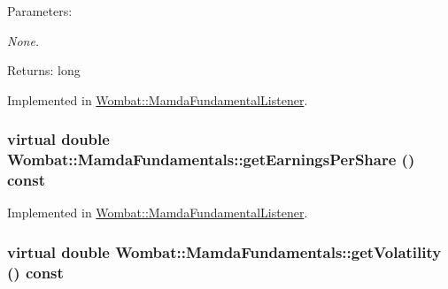 \begin{Desc}
\item[Parameters:]
\begin{description}
\item[{\em None.}]\end{description}
\end{Desc}
\begin{Desc}
\item[Returns:]long\end{Desc}


Implemented in \hyperlink{classWombat_1_1MamdaFundamentalListener_271ea50e95b80126e461612c0ab7ed09}{Wombat::Mamda\-Fundamental\-Listener}.\hypertarget{classWombat_1_1MamdaFundamentals_7e942012bd9711d3bde88b1da09be638}{
\subsubsection[getEarningsPerShare]{\setlength{\rightskip}{0pt plus 5cm}virtual double Wombat::Mamda\-Fundamentals::get\-Earnings\-Per\-Share () const}}
\label{classWombat_1_1MamdaFundamentals_7e942012bd9711d3bde88b1da09be638}




Implemented in \hyperlink{classWombat_1_1MamdaFundamentalListener_e4219dceb76af963348acab9b9a27246}{Wombat::Mamda\-Fundamental\-Listener}.\hypertarget{classWombat_1_1MamdaFundamentals_e5719741fcc970ea66688ed60f6541ad}{
\subsubsection[getVolatility]{\setlength{\rightskip}{0pt plus 5cm}virtual double Wombat::Mamda\-Fundamentals::get\-Volatility () const}}
\label{classWombat_1_1MamdaFundamentals_e5719741fcc970ea66688ed60f6541ad}





